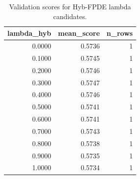 \begin{table}[t]
\caption{Validation scores for Hyb-FPDE lambda candidates.}
\label{tab:lambda_distribution_computed}
\centering
\begin{tabular}{rrr}
\toprule
lambda\_hyb & mean\_score & n\_rows \\
\midrule
0.0000 & 0.5736 & 1 \\
0.1000 & 0.5745 & 1 \\
0.2000 & 0.5746 & 1 \\
0.3000 & 0.5747 & 1 \\
0.4000 & 0.5746 & 1 \\
0.5000 & 0.5741 & 1 \\
0.6000 & 0.5741 & 1 \\
0.7000 & 0.5743 & 1 \\
0.8000 & 0.5738 & 1 \\
0.9000 & 0.5735 & 1 \\
1.0000 & 0.5734 & 1 \\
\bottomrule
\end{tabular}

\end{table}
